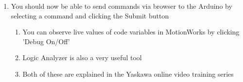 \documentclass{article}
\begin{document}
\begin{enumerate} [label=\textbf{\arabic*}]
\begin{enumerate}
                \item For administrative access, the username is \texttt{Admin} and the password is \texttt{MP2600} (case sensitive)
                \item If the Choppers are not operating correctly, try rebooting through this menu
            \end{enumerate}
            \item You should now be able to send commands via browser to the Arduino by selecting a command and clicking the Submit button
            \begin{enumerate}
                \item You can observe live values of code variables in MotionWorks by clicking ’Debug On/Off’
                \item Logic Analyzer is also a very useful tool
                \item Both of these are explained in the Yaskawa online video training series
            \end{enumerate}
        \end{enumerate}
        
\end{document}

